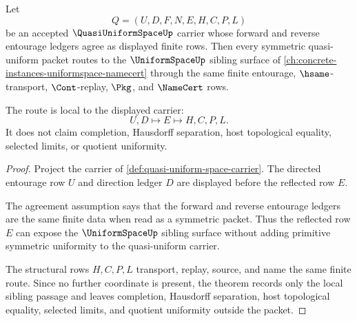 \begin{theorem}
\label{thm:quasi-uniform-space-uniform-sibling-route}
Let
$$
Q=(U,D,F,N,E,H,C,P,L)
$$
be an accepted $\QuasiUniformSpaceUp$ carrier whose forward and reverse entourage ledgers agree as displayed finite rows. Then every symmetric quasi-uniform packet routes to the $\UniformSpaceUp$ sibling surface of \autoref{ch:concrete-instances-uniformspace-namecert} through the same finite entourage, $\hsame$-transport, $\Cont$-replay, $\Pkg$, and $\NameCert$ rows.

The route is local to the displayed carrier:
$$
U,D \longmapsto E \longmapsto H,C,P,L .
$$
It does not claim completion, Hausdorff separation, host topological equality, selected limits, or quotient uniformity.
\end{theorem}
\begin{proof}
Project the carrier of \autoref{def:quasi-uniform-space-carrier}. The directed entourage row $U$ and direction ledger $D$ are displayed before the reflected row $E$.

The agreement assumption says that the forward and reverse entourage ledgers are the same finite data when read as a symmetric packet. Thus the reflected row $E$ can expose the $\UniformSpaceUp$ sibling surface without adding primitive symmetric uniformity to the quasi-uniform carrier.

The structural rows $H,C,P,L$ transport, replay, source, and name the same finite route. Since no further coordinate is present, the theorem records only the local sibling passage and leaves completion, Hausdorff separation, host topological equality, selected limits, and quotient uniformity outside the packet.
\end{proof}
